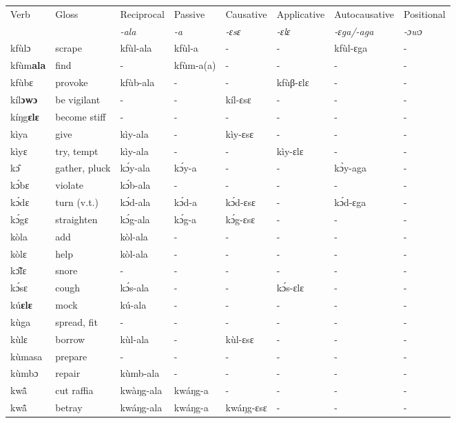 \begin{sidewaystable}
\begin{tabular}{llllllll}
 \lsptoprule
 Verb & Gloss & Reciprocal & Passive  & Causative  & Applicative   & Autocausative & Positional   \\
  &    & {\itshape -ala} & {\itshape -a} & {\itshape -ɛsɛ} & {\itshape -ɛlɛ} & {\itshape -ɛga/-aga}  & {\itshape -ɔwɔ}  \\
\midrule
kfùlɔ & scrape & kfùl-ala & kfùl-a & - & - & kfùl-ɛga & - \\
kfùm{\bfseries ala} & find & - & kfùm-a(a) & - & - & - & - \\
kfùbɛ & provoke & kfùb-ala & - & - &  kfùβ-ɛlɛ & - & - \\
kíl{\bfseries ɔwɔ} & be vigilant & - & - & kíl-ɛsɛ & - & - & - \\
kíŋg{\bfseries ɛlɛ} & become stiff & - & - & - & - & - & - \\
kìya & give & kìy-ala & - & kìy-ɛsɛ & - & - & - \\
kìyɛ & try, tempt & kìy-ala & - & - &  kìy-ɛlɛ & - & - \\
kɔ̂ & gather, pluck & kɔ́y-ala & kɔ́y-a & - & - & kɔ̀y-aga & - \\
kɔ́bɛ & violate & kɔ́b-ala & - & - & - & - & - \\
kɔ́dɛ & turn (v.t.) & kɔ́d-ala & kɔ́d-a & kɔ́d-ɛsɛ & - & kɔ́d-ɛga & - \\
kɔ́gɛ & straighten & kɔ́g-ala & kɔ́g-a & kɔ́g-ɛsɛ & - & - & - \\
kòla & add & kòl-ala & - & - & - & - & - \\
kòlɛ & help & kòl-ala & - & - & - & - & - \\
kɔ̃̂lɛ & snore & - & -  & - & - & - & - \\
kɔ́sɛ & cough & kɔ́s-ala & - & - & kɔ́s-ɛlɛ & - & - \\
kú{\bfseries ɛlɛ} & mock & kú-ala & - & - & -  & - & - \\
kùga & spread, fit & - & - & - &  - & - & - \\
kùlɛ & borrow & kùl-ala & - & kùl-ɛsɛ & - & - & - \\
kùmasa & prepare & - & - & - & - & - &  - \\
kùmbɔ & repair & kùmb-ala & - & - & - & - & - \\
kwã̂ & cut raffia & kwàŋg-ala & kwáŋg-a & - & - & - & - \\
kwã̂ & betray & kwáŋg-ala & kwáŋg-a & kwáŋg-ɛsɛ & - & - & - \\
\midrule\end{tabular}\end{sidewaystable}

